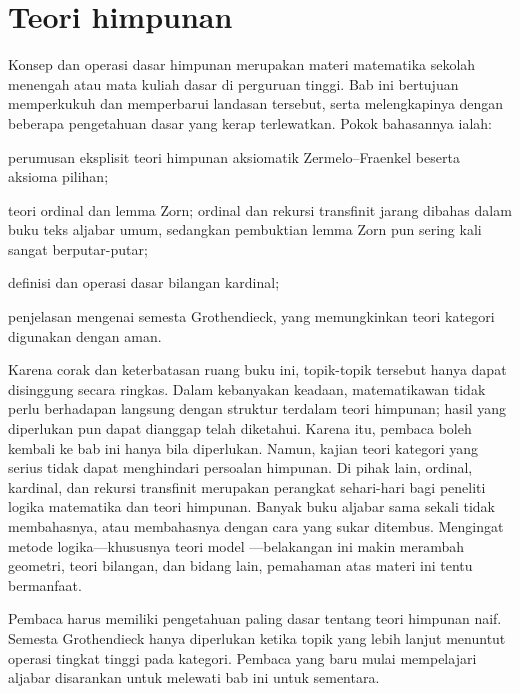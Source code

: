 
\chapter{Teori himpunan}
Konsep dan operasi dasar himpunan merupakan materi matematika sekolah menengah atau mata kuliah dasar di perguruan tinggi. Bab ini bertujuan memperkukuh dan memperbarui landasan tersebut, serta melengkapinya dengan beberapa pengetahuan dasar yang kerap terlewatkan. Pokok bahasannya ialah:
\begin{compactitem}
	\item perumusan eksplisit teori himpunan aksiomatik Zermelo--Fraenkel beserta aksioma pilihan;
	\item teori ordinal dan lemma Zorn; ordinal dan rekursi transfinit jarang dibahas dalam buku teks aljabar umum, sedangkan pembuktian lemma Zorn pun sering kali sangat berputar-putar;
	\item definisi dan operasi dasar bilangan kardinal;
	\item penjelasan mengenai semesta Grothendieck, yang memungkinkan teori kategori digunakan dengan aman.
\end{compactitem}

Karena corak dan keterbatasan ruang buku ini, topik-topik tersebut hanya dapat disinggung secara ringkas. Dalam kebanyakan keadaan, matematikawan tidak perlu berhadapan langsung dengan struktur terdalam teori himpunan; hasil yang diperlukan pun dapat dianggap telah diketahui. Karena itu, pembaca boleh kembali ke bab ini hanya bila diperlukan. Namun, kajian teori kategori yang serius tidak dapat menghindari persoalan himpunan. Di pihak lain, ordinal, kardinal, dan rekursi transfinit merupakan perangkat sehari-hari bagi peneliti logika matematika dan teori himpunan. Banyak buku aljabar sama sekali tidak membahasnya, atau membahasnya dengan cara yang sukar ditembus. Mengingat metode logika---khususnya teori model \cite{Feng17}---belakangan ini makin merambah geometri, teori bilangan, dan bidang lain, pemahaman atas materi ini tentu bermanfaat. 

\begin{wenxintishi}
	Pembaca harus memiliki pengetahuan paling dasar tentang teori himpunan naif. Semesta Grothendieck hanya diperlukan ketika topik yang lebih lanjut menuntut operasi tingkat tinggi pada kategori. Pembaca yang baru mulai mempelajari aljabar disarankan untuk melewati bab ini untuk sementara.
\end{wenxintishi}

